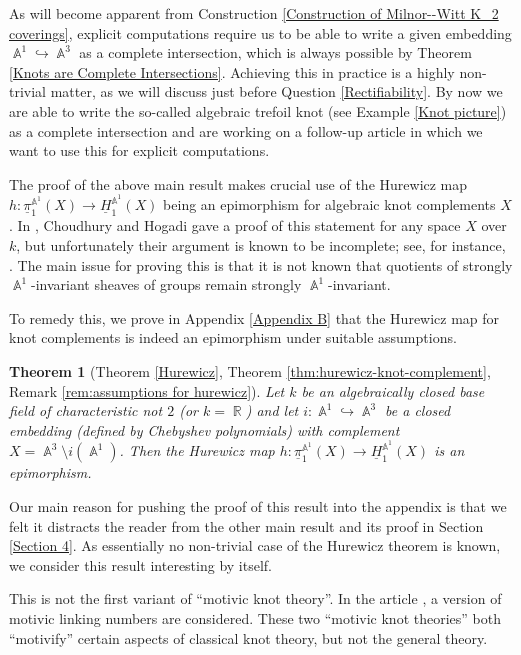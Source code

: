 \documentclass[english]{amsart}
\newtheorem*{thm*}{Theorem}
\theoremstyle{definition}
\DeclareMathOperator{\R}{\mathbb{R}}
\DeclareMathOperator{\A}{\mathbb{A}}
\begin{document}
As will become apparent from Construction \ref{Construction of Milnor--Witt K_2 coverings}, explicit computations require us to be able to write a given embedding $\A^1 \hookrightarrow \A^3$ as a complete intersection, which is always possible by Theorem \ref{Knots are Complete Intersections}. Achieving this in practice is a highly non-trivial matter, as we will discuss just before Question \ref{Rectifiability}. By now we are able to write the so-called algebraic trefoil knot (see Example \ref{Knot picture}) as a complete intersection and are working on a follow-up article \cite{WW2} in which we want to use this for explicit computations.

\hfill

The proof of the above main result makes crucial use of the Hurewicz map $h\colon\underline{\pi}_1^{\A^1}\!(X)\to\underline{H}_1^{\A^1}\!(X)$ being an epimorphism for algebraic knot complements $X$. In \cite{MR4442407}, Choudhury and Hogadi gave a proof of this statement for any space $X$ over $k$, but unfortunately their argument is known to be incomplete; see, for instance, \cite{zbMATH08029975}. The main issue for proving this is that it is not known that quotients of strongly $\A^1$-invariant sheaves of groups remain strongly $\A^1$-invariant. 

To remedy this, we prove in Appendix \ref{Appendix B} that the Hurewicz map for knot complements is indeed an epimorphism  under suitable assumptions.
\begin{thm*}[Theorem \ref{Hurewicz}, Theorem \ref{thm:hurewicz-knot-complement}, Remark \ref{rem:assumptions for hurewicz}]
Let $k$ be an algebraically closed base field of characteristic not $2$ (or $k = \R$) and let $i \colon \A^1 \hookrightarrow \A^3$ be a closed embedding (defined by Chebyshev polynomials) with complement $X = \A^3 \setminus i(\A^1)$. Then the Hurewicz map $h\colon\underline{\pi}_1^{\A^1}\!(X)\to\underline{H}_1^{\A^1}\!(X)$ is an epimorphism.
\end{thm*}
Our main reason for pushing the proof of this result into the appendix is that we felt it distracts the reader from the other main result and its proof in Section \ref{Section 4}. As essentially no non-trivial case of the Hurewicz theorem is known, we consider this result interesting by itself.

\hfill

This is not the first variant of ``motivic knot theory''. In the article \cite{Clementine}, a version of motivic linking numbers are considered. These two “motivic knot theories” both “motivify” certain aspects of classical knot theory, but not the general theory. 
\end{document}
